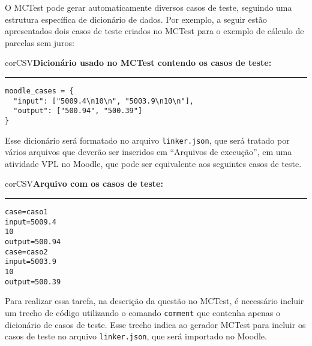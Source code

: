 O MCTest pode gerar automaticamente diversos casos de teste, seguindo uma estrutura específica de dicionário de dados. Por exemplo, a seguir estão apresentados dois casos de teste criados no MCTest para o exemplo de cálculo de parcelas sem juros:

\begin{myboxCode}{corCSV}{\textbf{Dicionário usado no MCTest contendo os casos de teste:}}\vspace{3mm}
\hrule
\begin{verbatim}
moodle_cases = {
  "input": ["5009.4\n10\n", "5003.9\n10\n"],
  "output": ["500.94", "500.39"]
}
\end{verbatim}
\end{myboxCode}

Esse dicionário será formatado no arquivo \verb|linker.json|, que será tratado por vários arquivos que deverão ser inseridos em ``Arquivos de execução'', em uma atividade VPL no Moodle, que pode ser equivalente aos seguintes casos de teste.

\begin{myboxCode}{corCSV}{\textbf{Arquivo com os casos de teste:}}\vspace{3mm}
\hrule
\begin{verbatim}
case=caso1
input=5009.4
10
output=500.94
case=caso2
input=5003.9
10
output=500.39
\end{verbatim}
\end{myboxCode}

Para realizar essa tarefa, na descrição da questão no MCTest, é necessário incluir um trecho de código utilizando o comando \verb|comment| que contenha apenas o dicionário de casos de teste. Esse trecho indica ao gerador MCTest para incluir os casos de teste no arquivo \verb|linker.json|, que será importado no Moodle.


